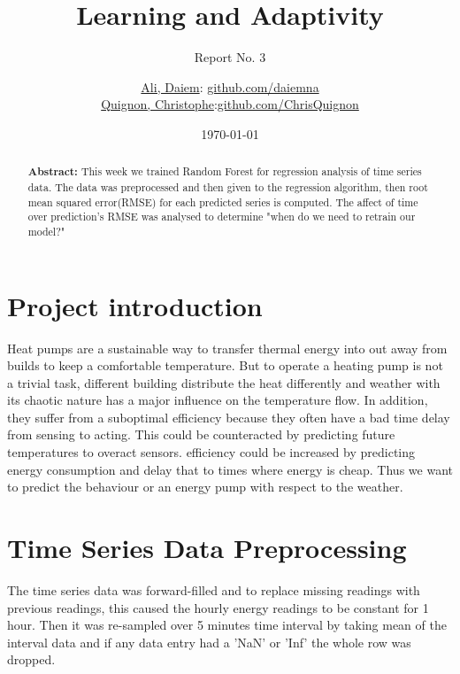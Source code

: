 \documentclass{scrartcl}
\begin{document}
\title{Learning and Adaptivity}
\subtitle{Report No. 3}
\author{
  \href{daiem.ali@smail.inf.h-brs.de}{Ali, Daiem}: \href{https://github.com/daiemna}{github.com/daiemna}\\
  \href{christophe.quignon@smail.inf.h-brs.de}{Quignon, Christophe}:\href{https://github.com/ChrisQuignon}{github.com/ChrisQuignon}
}
\date{\today}


\maketitle



\begin{abstract}
\textbf{Abstract:} This week we trained Random Forest for regression analysis of time series data. The data was preprocessed and then given to the regression algorithm, then root mean squared error(RMSE) for each predicted series is computed. The affect of time over prediction's RMSE was analysed to determine "when do we need to retrain our model?"
\end{abstract}


\section{Project introduction}
Heat pumps are a sustainable way to transfer thermal energy into out away from builds to keep a comfortable temperature. But to operate a heating pump is not a trivial task, different building distribute the heat differently and weather with its chaotic nature has a major influence on the temperature flow. In addition, they suffer from a suboptimal efficiency because they often have a bad time delay from sensing to acting. This could be counteracted by predicting future temperatures to overact sensors. efficiency could be increased by predicting energy consumption and delay that to times where energy is cheap. 
Thus we want to predict the behaviour or an energy pump with respect to the weather.


\section{Time Series Data Preprocessing}
%
The time series data was forward-filled and to replace missing readings with previous readings, this caused the hourly energy readings to be constant for 1 hour. Then it was re-sampled over 5 minutes time interval by taking mean of the interval data and if any data entry had a 'NaN' or 'Inf' the whole row was dropped. \par
\end{document}
